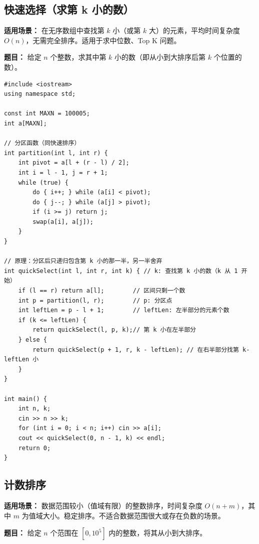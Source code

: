 \documentclass[12pt,a4paper]{ctexart}
\begin{document}
\subsection{快速选择（求第 k 小的数）}
\textbf{适用场景：} 在无序数组中查找第 $k$ 小（或第 $k$ 大）的元素，平均时间复杂度 $O(n)$，无需完全排序。适用于求中位数、Top K 问题。

\textbf{题目：} 给定 $n$ 个整数，求其中第 $k$ 小的数（即从小到大排序后第 $k$ 个位置的数）。

\begin{lstlisting}[caption={快速选择——基于快排分区，只递归一边}]
#include <iostream>
using namespace std;

const int MAXN = 100005;
int a[MAXN];

// 分区函数（同快速排序）
int partition(int l, int r) {
    int pivot = a[l + (r - l) / 2];
    int i = l - 1, j = r + 1;
    while (true) {
        do { i++; } while (a[i] < pivot);
        do { j--; } while (a[j] > pivot);
        if (i >= j) return j;
        swap(a[i], a[j]);
    }
}

// 原理：分区后只递归包含第 k 小的那一半，另一半舍弃
int quickSelect(int l, int r, int k) { // k: 查找第 k 小的数（k 从 1 开始）
    if (l == r) return a[l];        // 区间只剩一个数
    int p = partition(l, r);        // p: 分区点
    int leftLen = p - l + 1;        // leftLen: 左半部分的元素个数
    if (k <= leftLen) {
        return quickSelect(l, p, k);// 第 k 小在左半部分
    } else {
        return quickSelect(p + 1, r, k - leftLen); // 在右半部分找第 k-leftLen 小
    }
}

int main() {
    int n, k;
    cin >> n >> k;
    for (int i = 0; i < n; i++) cin >> a[i];
    cout << quickSelect(0, n - 1, k) << endl;
    return 0;
}
\end{lstlisting}

\subsection{计数排序}
\textbf{适用场景：} 数据范围较小（值域有限）的整数排序，时间复杂度 $O(n+m)$，其中 $m$ 为值域大小。稳定排序。不适合数据范围很大或存在负数的场景。

\textbf{题目：} 给定 $n$ 个范围在 $[0, 10^5]$ 内的整数，将其从小到大排序。
\end{document}

